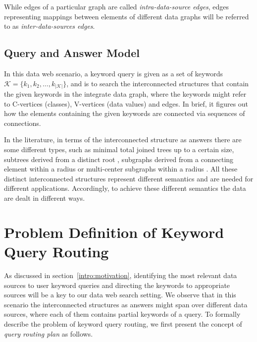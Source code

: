 While edges of a particular graph are called \emph{intra-data-source edges}, edges representing
mappings between elements of different data graphs will be referred to as \emph{inter-data-sources
edges}.


\subsection{Query and Answer Model}
In this data web scenario, a keyword query is given as a set of keywords $\mathcal{K} =
\{k_1,k_2,\ldots,k_{\left\vert\mathcal{K}\right\vert}\}$, and is to search the interconnected
structures that contain the given keywords in the integrate data graph, where the keywords might
refer to C-vertices (classes), V-vertices (data values) and edges. In brief, it figures out how the
elements containing the given keywords are connected via sequences of connections.

In the literature, in terms of the interconnected structure as answers there are some different
types, such as minimal total joined trees up to a certain size\citep{DBLP:conf/icde/AgrawalCD02,
DBLP:conf/vldb/HristidisP02, DBLP:conf/vldb/HristidisGP03, DBLP:conf/sigmod/LiuYMC06,
DBLP:conf/sigmod/LuoLWZ07, DBLP:conf/icde/SayyadianLDG07}, subtrees derived from a distinct root
\citep{DBLP:conf/icde/BhalotiaHNCS02, DBLP:conf/vldb/KacholiaPCSDK05, DBLP:conf/sigmod/HeWYY07},
subgraphs derived from a connecting element within a radius \citep{DBLP:conf/icde/TranWRC09} or
multi-center subgraphs within a radius \citep{DBLP:conf/icde/QinYCT09}. All these distinct
interconnected structures represent different semantics and are needed for different applications.
Accordingly, to achieve these different semantics the data are dealt in different ways.

\section{Problem Definition of Keyword Query Routing}\label{pre:routing}

As discussed in section~\ref{intro:motivation}, identifying the most relevant data sources to user
keyword queries and directing the keywords to appropriate sources will be a key to our data web
search setting. We observe that in this scenario the interconnected structures as answers might span
over different data sources, where each of them contains partial keywords of a query. To formally
describe the problem of keyword query routing, we first present the concept of {\em query routing
plan} as follows.

